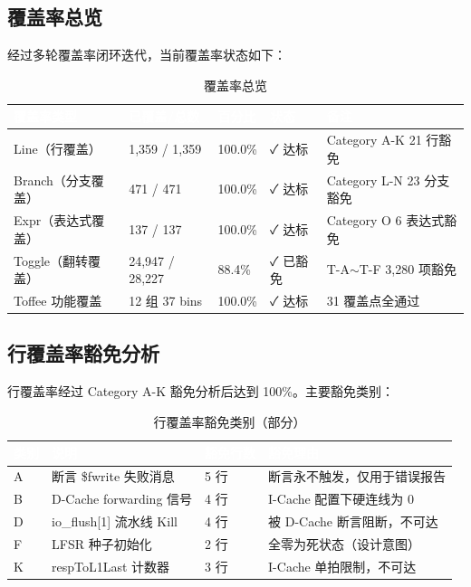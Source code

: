 \documentclass[12pt,a4paper]{ctexart}
\newcommand{\thcell}[1]{\textcolor{white}{\bfseries #1}}
\begin{document}
\subsection{覆盖率总览}

经过多轮覆盖率闭环迭代，当前覆盖率状态如下：

\begin{table}[H]
\centering
\caption{覆盖率总览}
\small
\renewcommand{\arraystretch}{1.3}
\begin{tabular}{@{}p{2.8cm}p{2cm}p{1.5cm}p{2cm}p{3.5cm}@{}}
\toprule
\rowcolor{primaryblue}
\thcell{覆盖率类型} & \thcell{已覆盖/总数} & \thcell{百分比} & \thcell{状态} & \thcell{备注} \\
\midrule
\rowcolor{rowgray} Line（行覆盖） & 1,359 / 1,359 & 100.0\% & ✓ 达标 & Category A-K 21 行豁免 \\
Branch（分支覆盖） & 471 / 471 & 100.0\% & ✓ 达标 & Category L-N 23 分支豁免 \\
\rowcolor{rowgray} Expr（表达式覆盖） & 137 / 137 & 100.0\% & ✓ 达标 & Category O 6 表达式豁免 \\
Toggle（翻转覆盖） & 24,947 / 28,227 & 88.4\% & ✓ 已豁免 & T-A$\sim$T-F 3,280 项豁免 \\
\rowcolor{rowgray} Toffee 功能覆盖 & 12 组 37 bins & 100.0\% & ✓ 达标 & 31 覆盖点全通过 \\
\bottomrule
\end{tabular}
\end{table}

\subsection{行覆盖率豁免分析}

行覆盖率经过 Category A-K 豁免分析后达到 100\%。主要豁免类别：

\begin{table}[H]
\centering
\caption{行覆盖率豁免类别（部分）}
\small
\renewcommand{\arraystretch}{1.2}
\begin{tabular}{@{}p{1.2cm}p{3.8cm}p{1.8cm}p{5.5cm}@{}}
\toprule
\rowcolor{primaryblue}
\thcell{类别} & \thcell{说明} & \thcell{豁免行数} & \thcell{豁免理由} \\
\midrule
\rowcolor{rowgray} A & 断言 \$fwrite 失败消息 & 5 行 & 断言永不触发，仅用于错误报告 \\
B & D-Cache forwarding 信号 & 4 行 & I-Cache 配置下硬连线为 0 \\
\rowcolor{rowgray} D & io\_flush[1] 流水线 Kill & 4 行 & 被 D-Cache 断言阻断，不可达 \\
F & LFSR 种子初始化 & 2 行 & 全零为死状态（设计意图） \\
\rowcolor{rowgray} K & respToL1Last 计数器 & 3 行 & I-Cache 单拍限制，不可达 \\
\bottomrule
\end{tabular}
\end{table}
\end{document}
